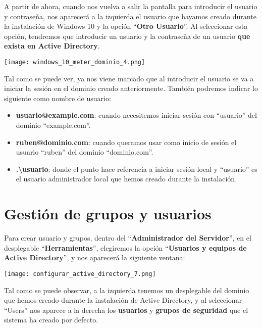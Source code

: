 A partir de ahora, cuando nos vuelva a salir la pantalla para introducir el usuario y contraseña, nos aparecerá a la izquierda el usuario que hayamos creado durante la instalación de Windows 10 y la opción “\textbf{Otro Usuario}”. Al seleccionar esta opción, tendremos que introducir un usuario y la contraseña de un usuario \textbf{que exista en Active Directory}.

\begin{center}
    \vspace{-20pt}
    \texttt{[image: windows\_10\_meter\_dominio\_4.png]}
    \vspace{-20pt}
\end{center}

Tal como se puede ver, ya nos viene marcado que al introducir el usuario se va a iniciar la sesión en el dominio creado anteriormente. También podremos indicar lo siguiente como nombre de usuario:

\begin{itemize}
    \item \textbf{usuario@example.com}: cuando necesitemos iniciar sesión con “usuario” del dominio “example.com”.
    \item \textbf{ruben@dominio.com}: cuando queramos usar como inicio de sesión el usuario “ruben” del dominio “dominio.com”.
    \item \textbf{.\textbackslash{usuario}}: donde el punto hace referencia a iniciar sesión local y “usuario” es el usuario administrador local que hemos creado durante la instalación.
\end{itemize}

\chapter{Gestión de grupos y usuarios}
Para crear usuario y grupos, dentro del “\textbf{Administrador del Servidor}”, en el desplegable “\textbf{Herramientas}”, elegiremos la opción “\textbf{Usuarios y equipos de Active Directory}”, y nos aparecerá la siguiente ventana:

\begin{center}
    \vspace{-15pt}
    \texttt{[image: configurar\_active\_directory\_7.png]}
    \vspace{-20pt}
\end{center}

Tal como se puede observar, a la izquierda tenemos un desplegable del dominio que hemos creado durante la instalación de Active Directory, y al seleccionar “Users” nos aparece a la derecha los \textbf{usuarios}  y \textbf{grupos de seguridad} que el sistema ha creado por defecto.

